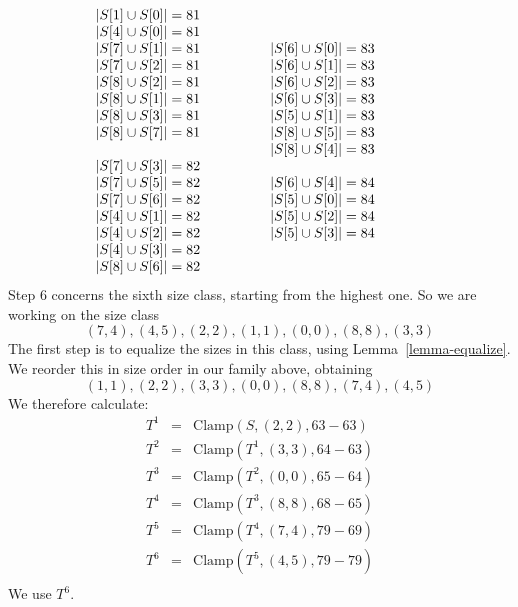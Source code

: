 \documentclass[12pt]{article}
\theoremstyle{definition}
\newcommand{\Clamp}{\mbox{Clamp}}
\begin{document}
\[\begin{array}[t]{l@{\qquad\qquad}l@{\qquad\qquad}l}
\begin{array}{l}
|S[1] \cup S[0]| = 81 \\
|S[4] \cup S[0]| = 81 \\
|S[7] \cup S[1]| = 81 \\
|S[7] \cup S[2]| = 81 \\
|S[8] \cup S[2]| = 81 \\
|S[8] \cup S[1]| = 81 \\
|S[8] \cup S[3]| = 81 \\
|S[8] \cup S[7]| = 81 \\
  \\
|S[7] \cup S[3]| = 82 \\
|S[7] \cup S[5]| = 82 \\
|S[7] \cup S[6]| = 82 \\
|S[4] \cup S[1]| = 82 \\
|S[4] \cup S[2]| = 82 \\
|S[4] \cup S[3]| = 82 \\
|S[8] \cup S[6]| = 82 \\
 \end{array}
 &
  \begin{array}{l}
|S[6] \cup S[0]| = 83 \\
|S[6] \cup S[1]| = 83 \\
|S[6] \cup S[2]| = 83 \\
|S[6] \cup S[3]| = 83 \\
|S[5] \cup S[1]| = 83 \\
|S[8] \cup S[5]| = 83 \\
|S[8] \cup S[4]| = 83 \\
  \\
|S[6] \cup S[4]| = 84 \\
|S[5] \cup S[0]| = 84 \\
|S[5] \cup S[2]| = 84 \\
|S[5] \cup S[3]| = 84 \\
 \end{array} 
 \end{array}
 \]
Step $6$ concerns the sixth size class, starting from the highest one.
So  we are working on the size class 
 \[  (7,4),(4,5),(2, 2),(1,1),(0,0),(8,8), (3,3)
 \]
 The first step is to equalize the sizes in this class, using Lemma~\ref{lemma-equalize}.
 We reorder this in size order in our family above, obtaining
  \[  (1,1), (2, 2), (3,3),  (0,0),(8,8), (7,4),(4,5)
 \]
 We therefore calculate:
\[ \begin{array}{lcl}
 T^1  & = &  \Clamp(S,(2,2), 63-63)\\

T^2 & = & \Clamp(T^1,(3,3),  64-63)\\

T^{3} & = & \Clamp(T^{2}, (0,0), 65-64 )\\
T^{4} & = & \Clamp(T^{3}, (8,8), 68-65 )\\
T^{5} & = & \Clamp(T^4, (7,4),79-69 )\\
T^{6} & = & \Clamp(T^{5}, (4,5), 79-79)\\
\end{array}
\]
 We use $T^6$.
 
\end{document}
